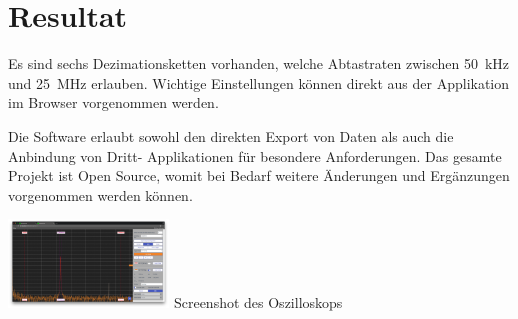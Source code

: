 {    %
    \section{Resultat}
    Es  sind sechs  Dezimationsketten vorhanden,  welche Abtastraten  zwischen
    \SI{50}{\kHz} und  \SI{25}{\MHz} erlauben. Wichtige  Einstellungen können
    direkt aus der Applikation im Browser vorgenommen werden.

    Die Software  erlaubt sowohl den  direkten Export  von Daten als  auch die
    Anbindung  von Dritt-  Applikationen f\"ur  besondere Anforderungen.   Das
    gesamte Projekt ist Open Source, womit bei Bedarf weitere \"Anderungen und
    Erg\"anzungen vorgenommen werden k\"onnen.

    \vspace{4ex}
    \begin{center}
        \includegraphics[width=0.32\textwidth]{images/p6fhu-scope.png}
        \footnotesize{Screenshot des Oszilloskops}
    \end{center}
}

